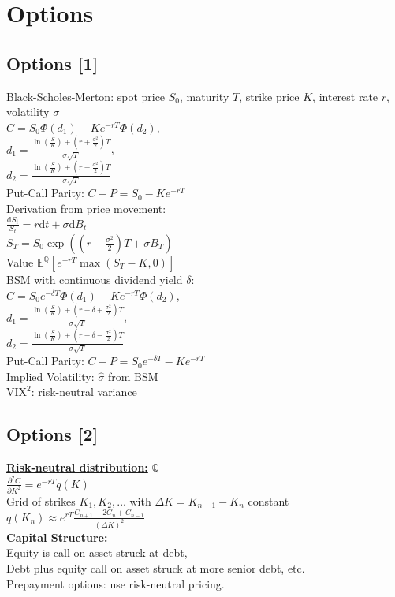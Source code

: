 \section{Options}
	\subsection*{Options [1]}
	Black-Scholes-Merton: spot price $S_{0}$, maturity $T$, strike price $K$, interest rate $r$, volatility $\sigma$\\
	$C = S_{0}\Phi\!\left(d_{1}\right) - Ke^{-rT}\Phi\!\left(d_{2}\right)$,\\
	$d_{1} = \frac{\ln\!\left(\frac{S}{K}\right) + \left(r + \frac{\sigma^{2}}{2}\right)T}{\sigma\sqrt{T}}$,\\
	$d_{2} = \frac{\ln\!\left(\frac{S}{K}\right) + \left(r - \frac{\sigma^{2}}{2}\right)T}{\sigma\sqrt{T}}$\\
	Put-Call Parity: $C - P = S_{0} - Ke^{-rT}$\\
	Derivation from price movement:\\
	$\frac{\mathrm{d}S_{t}}{S_{t}} = r\mathrm{d}t + \sigma\mathrm{d}B_{t}$\\
	$S_{T} = S_{0}\exp\left(\left(r - \frac{\sigma^{2}}{2}\right)T + \sigma B_{T}\right)$\\
	Value $\mathbb{E}^{\mathbb{Q}}\left[e^{-rT}\max\left(S_{T} - K, 0\right)\right]$\\
	BSM with continuous dividend yield $\delta$:\\
	$C = S_{0}e^{-\delta T}\Phi\!\left(d_{1}\right) - Ke^{-rT}\Phi\!\left(d_{2}\right)$,\\
	$d_{1} = \frac{\ln\!\left(\frac{S}{K}\right) + \left(r - \delta + \frac{\sigma^{2}}{2}\right)T}{\sigma\sqrt{T}}$,\\
	$d_{2} = \frac{\ln\!\left(\frac{S}{K}\right) + \left(r - \delta - \frac{\sigma^{2}}{2}\right)T}{\sigma\sqrt{T}}$\\
	Put-Call Parity: $C - P = S_{0}e^{-\delta T} - Ke^{-rT}$\\
	Implied Volatility: $\hat{\sigma}$ from BSM\\
	$\text{VIX}^{2}$: risk-neutral variance
	
	\subsection*{Options [2]}
	\underline{\textbf{Risk-neutral distribution:}} $\mathbb{Q}$\\
	$\frac{\partial^{2} C}{\partial K^{2}} = e^{-rT}q\!\left(K\right)$\\
	Grid of strikes $K_{1}, K_{2}, \dots$ with $\Delta K = K_{n+1} - K_{n}$ constant\\
	$q\!\left(K_{n}\right)\approx e^{rT}\frac{C_{n+1} - 2C_{n} + C_{n-1}}{\left(\Delta K\right)^{2}}$\\
	\underline{\textbf{Capital Structure:}}\\
	Equity is call on asset struck at debt,\\
	Debt plus equity call on asset struck at more senior debt, etc.\\
	Prepayment options: use risk-neutral pricing.
	